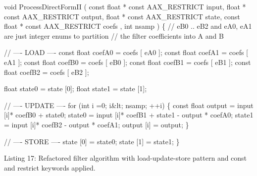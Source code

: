 \begin{DoxyCode}
\textcolor{keywordtype}{void}
ProcessDirectFormII (
    \textcolor{keyword}{const} \textcolor{keywordtype}{float} * \textcolor{keyword}{const} AAX\_RESTRICT input,
    \textcolor{keywordtype}{float} * \textcolor{keyword}{const} AAX\_RESTRICT output,
    \textcolor{keywordtype}{float} * \textcolor{keyword}{const} AAX\_RESTRICT state,
    \textcolor{keyword}{const} \textcolor{keywordtype}{float} * \textcolor{keyword}{const} AAX\_RESTRICT coefs ,
    \textcolor{keywordtype}{int} nsamp )
\{
    \textcolor{comment}{// eB0 .. eB2 and eA0, eA1 are just integer enums to partition}
    \textcolor{comment}{// the filter coefficients into A and B}

    \textcolor{comment}{// ---- LOAD ----}
    \textcolor{keyword}{const} \textcolor{keywordtype}{float} coefA0 = coefs [ eA0 ];
    \textcolor{keyword}{const} \textcolor{keywordtype}{float} coefA1 = coefs [ eA1 ];
    \textcolor{keyword}{const} \textcolor{keywordtype}{float} coefB0 = coefs [ eB0 ];
    \textcolor{keyword}{const} \textcolor{keywordtype}{float} coefB1 = coefs [ eB1 ];
    \textcolor{keyword}{const} \textcolor{keywordtype}{float} coefB2 = coefs [ eB2 ];

    \textcolor{keywordtype}{float} state0 = state [0];
    \textcolor{keywordtype}{float} state1 = state [1];

    \textcolor{comment}{// ---- UPDATE ----}
    \textcolor{keywordflow}{for} (\textcolor{keywordtype}{int} i =0; i&lt; nsamp; ++i)
    \{
        \textcolor{keyword}{const} \textcolor{keywordtype}{float} output = input [i]* coefB0 + state0;
        state0 = input [i]* coefB1 + state1 - output * coefA0;
        state1 = input [i]* coefB2 - output * coefA1;
        output [i] = output;
    \}

    \textcolor{comment}{// ---- STORE ----}
    state [0] = state0;
    state [1] = state1;
\} 
\end{DoxyCode}
  Listing 17\+: Refactored filter algorithm with load-\/update-\/store pattern and const and restrict keywords applied.

